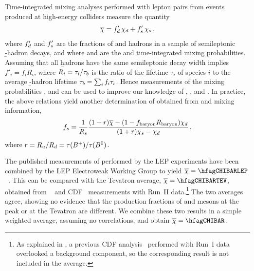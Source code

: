 Time-integrated mixing analyses performed with lepton pairs 
from  
events produced at high-energy colliders measure the quantity 
\begin{equation}
\chibar = f'_{\particle{d}} \,\chid + f'_{\particle{s}} \,\chis \,,
\labe{chibar}
\end{equation}
where $f'_{d}$ and $f'_{s}$ are 
the fractions of \Bd and \Bs hadrons 
in a sample of semileptonic \b-hadron decays, and where \chid and \chis 
are the \Bd and \Bs time-integrated mixing probabilities.
Assuming that all \b hadrons have the same semileptonic decay width implies 
$f'_i = f_i R_i$, where $R_i = \tau_i/\tau_{b}$ is the ratio of the lifetime 
$\tau_i$ of species $i$ to the average \b-hadron lifetime 
$\tau_{b} = \sum_i f_i \tau_i$.
Hence measurements of the mixing probabilities
\chibar, \chid and \chis can be used to improve our 
knowledge of \fBu, \fBd, \fBs and \fbb.
In practice, the above relations yield another determination of 
\fBs obtained from \fbb and mixing information, 
\begin{equation}
\fBs = \frac{1}{R_{\particle{s}}}
\frac{(1+r)\overline{\chi}-(1-\fbb R_{\rm baryon}) \chid}{(1+r)\chis - \chid} \,,
\labe{fBs-mixing}
\end{equation}
where $r=R_{u}/R_{d} = \tau(B^+)/\tau(B^0)$.

The published measurements of \chibar performed by the LEP
experiments have been combined by the LEP Electroweak Working Group to yield 
$\chibar = \hfagCHIBARLEP$~\cite{LEPEWWG:2005ema_mod}.
This can be compared with the Tevatron average, $\chibar = \hfagCHIBARTEV$,
obtained from \dzero~\cite{Abazov:2006qw} and CDF~\cite{CDFnote10335:2011}
measurements with Run~II data.\footnote{
  \label{foot:life_mix:Acosta:2003ie_mod}
  As explained in , a previous CDF analysis~\cite{Acosta:2003ie_mod}
  performed with Run~I data overlooked a background component, so the corresponding result is not 
  included in the average.}
The two averages agree, showing no evidence that the production fractions
of \Bd and \Bs mesons at the  peak or at the Tevatron are different.
We combine these two results in a simple weighted average,
assuming no correlations, and obtain 
$\chibar = \hfagCHIBAR$.

